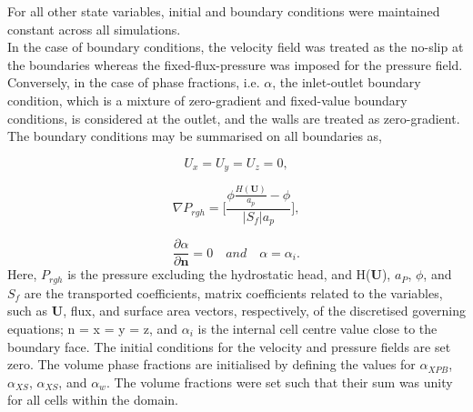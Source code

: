 For all other state variables, initial and boundary conditions were maintained constant across all simulations.\\

In the case of boundary conditions, the velocity field was treated as the no-slip at the boundaries whereas the fixed-flux-pressure was imposed for the pressure field. Conversely, in the case of phase fractions, i.e. ${\alpha}$, the inlet-outlet boundary condition, which is a mixture of zero-gradient and fixed-value boundary conditions, is considered at the outlet, and the walls are treated as zero-gradient. The boundary conditions may be summarised on all boundaries as,  

\begin{equation}
    \label{eq:boundaryU}
    U_x = U_y = U_z = 0,
\end{equation}

\begin{equation}
    \label{eq:boundaryPrgh}
    \nabla P_{rgh} = \bigg[\frac{\phi \frac{H(\mathbf{U})}{a_p} - \phi}{|S_f|a_p} \bigg],
\end{equation}

\begin{equation}
    \label{eq:boundaryAlpha}
    \frac{\partial \alpha}{\partial \mathbf{n}} = 0 \quad {and} \quad \alpha = \alpha_i.
\end{equation}
Here, ${P_{rgh}}$ is the pressure excluding the hydrostatic head, and H(\textbf{U}), ${a_P}$, ${\phi}$, and ${S_f}$ are the transported coefficients, matrix coefficients related to the variables, such as \textbf{U}, flux, and surface area vectors, respectively, of the discretised governing equations; n = x = y = z, and ${\alpha_i}$ is the internal cell centre value close to the boundary face. The initial conditions for the velocity and pressure fields are set zero. The volume phase fractions are initialised by defining the values for $\alpha_{{XPB}}$, $\alpha_{{XS}}$, $\alpha_{{XS}}$, and $\alpha_{{w}}$. The volume fractions were set such that their sum was unity for all cells within the domain. 

